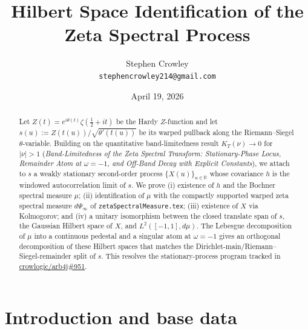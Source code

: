 \documentclass[11pt]{article}
\title{Hilbert Space Identification of the Zeta Spectral Process}
\author{Stephen Crowley\\\texttt{stephencrowley214@gmail.com}}
\date{April 19, 2026}
\theoremstyle{definition}
\begin{document}
\maketitle

\begin{abstract}
Let $Z(t) = e^{i\theta(t)}\zeta(\tfrac{1}{2}+it)$ be the Hardy $Z$-function and
let $s(u) := Z(t(u))/\sqrt{\theta'(t(u))}$ be its warped pullback along the
Riemann--Siegel $\theta$-variable. Building on the quantitative
band-limitedness result
$K_T(\nu)\to 0$ for $|\nu|>1$
(\textit{Band-Limitedness of the Zeta Spectral Transform: Stationary-Phase
Locus, Remainder Atom at $\omega=-1$, and Off-Band Decay with Explicit
Constants}), we attach to $s$ a weakly stationary second-order process
$\{X(u)\}_{u\in\mathbb{R}}$ whose covariance $h$ is the windowed
autocorrelation limit of $s$. We prove (i) existence of $h$ and the Bochner
spectral measure $\mu$; (ii) identification of $\mu$ with the compactly
supported warped zeta spectral measure $d\Psi_{\infty}$ of
\texttt{zetaSpectralMeasure.tex}; (iii) existence of $X$ via Kolmogorov; and
(iv) a unitary isomorphism between the closed translate span of $s$, the
Gaussian Hilbert space of $X$, and $L^{2}([-1,1],d\mu)$. The Lebesgue
decomposition of $\mu$ into a continuous pedestal and a singular atom at
$\omega=-1$ gives an orthogonal decomposition of these Hilbert spaces that
matches the Dirichlet-main/Riemann--Siegel-remainder split of $s$. This
resolves the stationary-process program tracked in
\href{https://github.com/crowlogic/arb4j/issues/951}{crowlogic/arb4j\#951}.
\end{abstract}

\section{Introduction and base data}\label{sec:intro}
\end{document}
